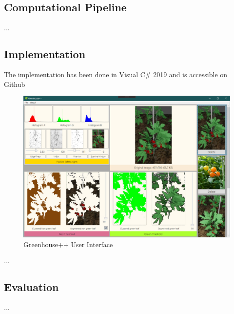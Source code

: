 \graphicspath{{members/ssr/figures/}}

\subsection{Computational Pipeline}\label{subsec:computational-pipeline}


...

\subsection{Implementation}


The implementation has been done in Visual C\# 2019 and is accessible on Github \cite{greenhouseplusplus}

\begin{figure}[h!]
    \includegraphics[width=\textwidth,height=\textheight,keepaspectratio]{greenhouseplusplus-ui.jpg}
    \caption{Greenhouse++ User Interface}
    \label{greenhouseplusplus:ui}
\end{figure}

...

\subsection{Evaluation}


...